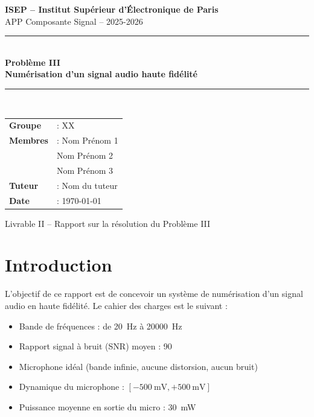 \documentclass[12pt, a4paper, french]{article}
\newcommand{\dB}{\text{dB}}
\begin{document}
\begin{titlepage}
    \centering
    \vspace*{2cm}
    
    {\Large \textbf{ISEP -- Institut Supérieur d'Électronique de Paris}}\\[0.5cm]
    {\large APP Composante Signal -- 2025-2026}\\[2cm]
    
    \rule{\textwidth}{1pt}\\[0.5cm]
    {\LARGE \textbf{Problème III}}\\[0.3cm]
    {\Large \textbf{Numérisation d'un signal audio haute fidélité}}\\[0.5cm]
    \rule{\textwidth}{1pt}\\[2cm]
    
    {\large
    \begin{tabular}{ll}
        \textbf{Groupe}   & : XX \\[0.3cm]
        \textbf{Membres}  & : Nom Prénom 1 \\
                          & \phantom{:} Nom Prénom 2 \\
                          & \phantom{:} Nom Prénom 3 \\[0.3cm]
        \textbf{Tuteur}   & : Nom du tuteur \\[0.3cm]
        \textbf{Date}     & : \today \\
    \end{tabular}
    }
    
    \vfill
    {\small Livrable II -- Rapport sur la résolution du Problème III}
\end{titlepage}

\tableofcontents
\newpage

\section{Introduction}

L'objectif de ce rapport est de concevoir un système de numérisation d'un signal audio en haute fidélité. Le cahier des charges est le suivant :

\begin{itemize}
    \item Bande de fréquences : de \SI{20}{\hertz} à \SI{20000}{\hertz}
    \item Rapport signal à bruit (SNR) moyen : \SI{90}{\dB}
    \item Microphone idéal (bande infinie, aucune distorsion, aucun bruit)
    \item Dynamique du microphone : $[-\SI{500}{\milli\volt}, +\SI{500}{\milli\volt}]$
    \item Puissance moyenne en sortie du micro : \SI{30}{\milli\watt}
\end{itemize}
\end{document}
